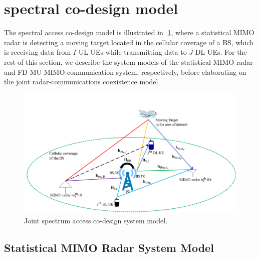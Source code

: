 \documentclass[9pt,journal]{IEEEtran}
\begin{document}
\section{spectral co-design model}
\label{sec:system}
The spectral access co-design model is illustrated in \figurename{$\;$\ref{fig:setup}}, where a statistical MIMO radar is detecting a moving target located in the cellular coverage of a BS, which is receiving data from $\mathit{I}$ UL UEs while transmitting data to $\mathit{J}$ DL UEs. For the rest of this section, we describe the system models of the statistical MIMO radar and FD MU-MIMO communication system, respectively, before elaborating on the joint radar-communications coexistence model.
 \begin{figure}[t]
	\label{fig:setup}
	\centering
	\includegraphics[width=1\columnwidth]{setup.png}
	\caption{Joint spectrum access co-design system model.}
	\vspace{-1em}
\end{figure}
\subsection{Statistical MIMO Radar System Model}
\end{document}

